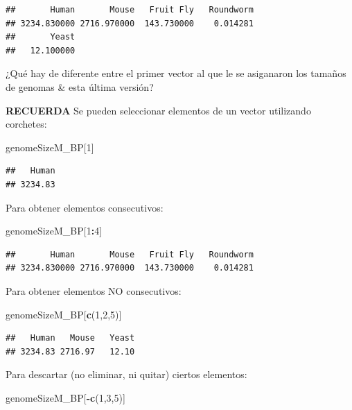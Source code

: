 \documentclass[
]{book}
\newenvironment{Shaded}{\begin{snugshade}}{\end{snugshade}}
\newcommand{\DecValTok}[1]{\textcolor[rgb]{0.00,0.00,0.81}{#1}}
\newcommand{\FunctionTok}[1]{\textcolor[rgb]{0.13,0.29,0.53}{\textbf{#1}}}
\newcommand{\NormalTok}[1]{#1}
\newcommand{\SpecialCharTok}[1]{\textcolor[rgb]{0.81,0.36,0.00}{\textbf{#1}}}
\begin{document}
\begin{verbatim}
##       Human       Mouse   Fruit Fly   Roundworm 
## 3234.830000 2716.970000  143.730000    0.014281 
##       Yeast 
##   12.100000
\end{verbatim}

¿Qué hay de diferente entre el primer vector al que le se asiganaron los tamaños de genomas \& esta última versión?

\textbf{RECUERDA}
Se pueden seleccionar elementos de un vector utilizando corchetes:

\begin{Shaded}
\begin{Highlighting}[]
\NormalTok{genomeSizeM\_BP[}\DecValTok{1}\NormalTok{]}
\end{Highlighting}
\end{Shaded}

\begin{verbatim}
##   Human 
## 3234.83
\end{verbatim}

Para obtener elementos consecutivos:

\begin{Shaded}
\begin{Highlighting}[]
\NormalTok{genomeSizeM\_BP[}\DecValTok{1}\SpecialCharTok{:}\DecValTok{4}\NormalTok{]}
\end{Highlighting}
\end{Shaded}

\begin{verbatim}
##       Human       Mouse   Fruit Fly   Roundworm 
## 3234.830000 2716.970000  143.730000    0.014281
\end{verbatim}

Para obtener elementos NO consecutivos:

\begin{Shaded}
\begin{Highlighting}[]
\NormalTok{genomeSizeM\_BP[}\FunctionTok{c}\NormalTok{(}\DecValTok{1}\NormalTok{,}\DecValTok{2}\NormalTok{,}\DecValTok{5}\NormalTok{)]}
\end{Highlighting}
\end{Shaded}

\begin{verbatim}
##   Human   Mouse   Yeast 
## 3234.83 2716.97   12.10
\end{verbatim}

Para descartar (no eliminar, ni quitar) ciertos elementos:

\begin{Shaded}
\begin{Highlighting}[]
\NormalTok{genomeSizeM\_BP[}\SpecialCharTok{{-}}\FunctionTok{c}\NormalTok{(}\DecValTok{1}\NormalTok{,}\DecValTok{3}\NormalTok{,}\DecValTok{5}\NormalTok{)]}
\end{Highlighting}
\end{Shaded}
\end{document}
